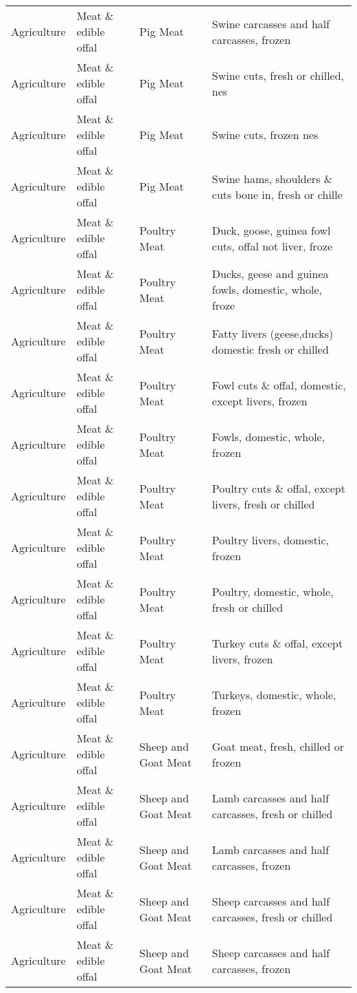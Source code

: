 \begin{appendices}
\begin{xltabular}{\textwidth}{|p{0.07\textwidth}|p{0.28\textwidth}|p{0.24\textwidth}|p{0.31\textwidth}|}
	Agriculture & Meat \& edible offal & Pig Meat & Swine carcasses and half carcasses, frozen \\
	Agriculture & Meat \& edible offal & Pig Meat & Swine cuts, fresh or chilled, nes \\
	Agriculture & Meat \& edible offal & Pig Meat & Swine cuts, frozen nes \\
	Agriculture & Meat \& edible offal & Pig Meat & Swine hams, shoulders \& cuts bone in, fresh or chille \\
	Agriculture & Meat \& edible offal & Poultry Meat & Duck, goose, guinea fowl cuts, offal not liver, froze \\
	Agriculture & Meat \& edible offal & Poultry Meat & Ducks, geese and guinea fowls, domestic, whole, froze \\
	Agriculture & Meat \& edible offal & Poultry Meat & Fatty livers (geese,ducks) domestic fresh or chilled \\
	Agriculture & Meat \& edible offal & Poultry Meat & Fowl cuts \& offal, domestic, except livers, frozen \\
	Agriculture & Meat \& edible offal & Poultry Meat & Fowls, domestic, whole, frozen \\
	Agriculture & Meat \& edible offal & Poultry Meat & Poultry cuts \& offal, except livers, fresh or chilled \\
	Agriculture & Meat \& edible offal & Poultry Meat & Poultry livers, domestic, frozen \\
	Agriculture & Meat \& edible offal & Poultry Meat & Poultry, domestic, whole, fresh or chilled \\
	Agriculture & Meat \& edible offal & Poultry Meat & Turkey cuts \& offal, except livers, frozen \\
	Agriculture & Meat \& edible offal & Poultry Meat & Turkeys, domestic, whole, frozen \\
	Agriculture & Meat \& edible offal & Sheep and Goat Meat & Goat meat, fresh, chilled or frozen \\
	Agriculture & Meat \& edible offal & Sheep and Goat Meat & Lamb carcasses and half carcasses, fresh or chilled \\
	Agriculture & Meat \& edible offal & Sheep and Goat Meat & Lamb carcasses and half carcasses, frozen \\
	Agriculture & Meat \& edible offal & Sheep and Goat Meat & Sheep carcasses and half carcasses, fresh or chilled \\
	Agriculture & Meat \& edible offal & Sheep and Goat Meat & Sheep carcasses and half carcasses, frozen \\

\end{xltabular}
\end{appendices}
